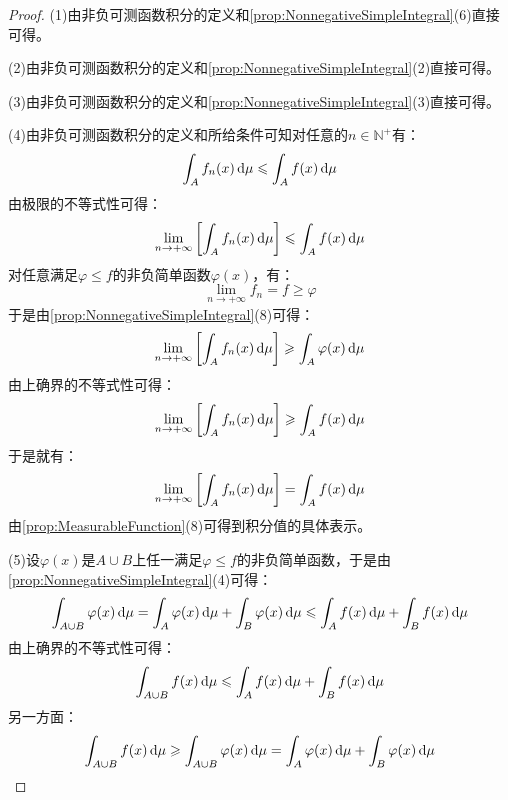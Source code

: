 \begin{proof}
	(1)由非负可测函数积分的定义和\cref{prop:NonnegativeSimpleIntegral}(6)直接可得。\par
	(2)由非负可测函数积分的定义和\cref{prop:NonnegativeSimpleIntegral}(2)直接可得。\par
	(3)由非负可测函数积分的定义和\cref{prop:NonnegativeSimpleIntegral}(3)直接可得。\par
	(4)由非负可测函数积分的定义和所给条件可知对任意的$n\in\mathbb{N}^+$有：
	\begin{equation*}
		\int_{A}f_n(x)\mathop{}\!\mathrm{d}\mu\leqslant\int_{A}f(x)\mathop{}\!\mathrm{d}\mu
	\end{equation*}
	由极限的不等式性可得：
	\begin{equation*}
		\lim_{n\to+\infty}\left[\int_{A}f_n(x)\mathop{}\!\mathrm{d}\mu\right]\leqslant\int_{A}f(x)\mathop{}\!\mathrm{d}\mu
	\end{equation*}
	对任意满足$\varphi\leqslant f$的非负简单函数$\varphi(x)$，有：
	\begin{equation*}
		\lim_{n\to+\infty}f_n=f\geqslant\varphi
	\end{equation*}
	于是由\cref{prop:NonnegativeSimpleIntegral}(8)可得：
	\begin{equation*}
		\lim_{n\to+\infty}\left[\int_{A}f_n(x)\mathop{}\!\mathrm{d}\mu\right]\geqslant\int_{A}\varphi(x)\mathop{}\!\mathrm{d}\mu
	\end{equation*}
	由上确界的不等式性可得：
	\begin{equation*}
		\lim_{n\to+\infty}\left[\int_{A}f_n(x)\mathop{}\!\mathrm{d}\mu\right]\geqslant\int_{A}f(x)\mathop{}\!\mathrm{d}\mu
	\end{equation*}
	于是就有：
	\begin{equation*}
		\lim_{n\to+\infty}\left[\int_{A}f_n(x)\mathop{}\!\mathrm{d}\mu\right]=\int_{A}f(x)\mathop{}\!\mathrm{d}\mu
	\end{equation*}
	由\cref{prop:MeasurableFunction}(8)可得到积分值的具体表示。\par
	(5)设$\varphi(x)$是$A\cup B$上任一满足$\varphi\leqslant f$的非负简单函数，于是由\cref{prop:NonnegativeSimpleIntegral}(4)可得：
	\begin{equation*}
		\int_{A\cup B}\varphi(x)\mathop{}\!\mathrm{d}\mu=\int_{A}\varphi(x)\mathop{}\!\mathrm{d}\mu+\int_{B}\varphi(x)\mathop{}\!\mathrm{d}\mu\leqslant\int_{A}f(x)\mathop{}\!\mathrm{d}\mu+\int_{B}f(x)\mathop{}\!\mathrm{d}\mu
	\end{equation*}
	由上确界的不等式性可得：
	\begin{equation*}
		\int_{A\cup B}f(x)\mathop{}\!\mathrm{d}\mu\leqslant\int_{A}f(x)\mathop{}\!\mathrm{d}\mu+\int_{B}f(x)\mathop{}\!\mathrm{d}\mu
	\end{equation*}
	另一方面：
	\begin{equation*}
		\int_{A\cup B}f(x)\dif\mu\geqslant\int_{A\cup B}\varphi(x)\dif\mu=\int_{A}\varphi(x)\dif\mu+\int_{B}\varphi(x)\dif\mu

\end{equation*}
\end{proof}
